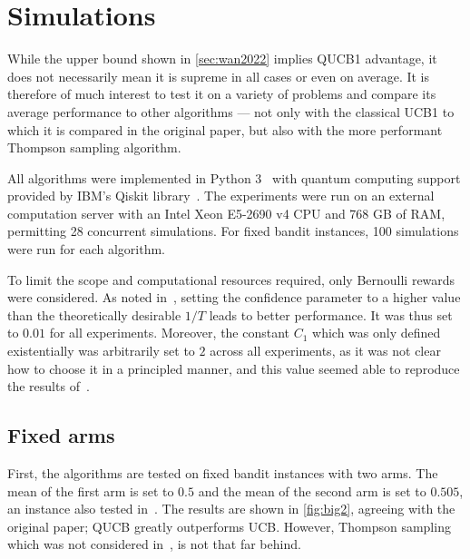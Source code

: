 \chapter{Simulations}
\label{sec:simulations}

While the upper bound shown in \cref{sec:wan2022} implies QUCB1 advantage, it does not necessarily mean it is supreme in all cases or even on average.
It is therefore of much interest to test it on a variety of problems and compare its average performance to other algorithms — not only with the classical UCB1 to which it is compared in the original paper, but also with the more performant Thompson sampling algorithm.

All algorithms were implemented in Python 3~\autocite{python} with quantum computing support provided by IBM's Qiskit library~\autocite{qiskit}.
The experiments were run on an external computation server with an Intel Xeon E5-2690 v4 CPU and 768 GB of RAM, permitting 28 concurrent simulations.
For fixed bandit instances, 100 simulations were run for each algorithm.

To limit the scope and computational resources required, only Bernoulli rewards were considered.
As noted in~\autocite{wan2022}, setting the confidence parameter to a higher value than the theoretically desirable $1/T$ leads to better performance.
It was thus set to $0.01$ for all experiments.
Moreover, the constant $C_1$ which was only defined existentially was arbitrarily set to $2$ across all experiments, as it was not clear how to choose it in a principled manner, and this value seemed able to reproduce the results of~\autocite{wan2022}.

\section{Fixed arms}
\label{sec:sim_fixed_arms}
First, the algorithms are tested on fixed bandit instances with two arms.
The mean of the first arm is set to $0.5$ and the mean of the second arm is set to $0.505$, an instance also tested in~\autocite{wan2022}.
The results are shown in \cref{fig:big2}, agreeing with the original paper; QUCB greatly outperforms UCB.
However, Thompson sampling which was not considered in~\autocite{wan2022}, is not that far behind.

